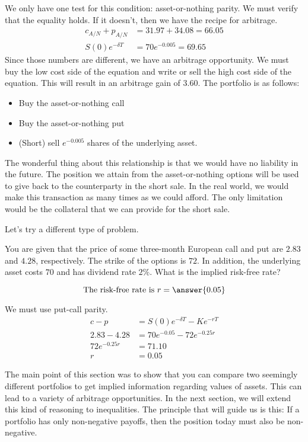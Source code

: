 \documentclass{ximera}
\begin{document}
\begin{solution}
We only have one test for this condition: asset-or-nothing parity. We must verify that the equality holds. If it doesn't, then we have the recipe for arbitrage.
	\begin{align*}
	c_{A/N}+p_{A/N}&=31.97+34.08=66.05\\
	S(0)e^{-\delta T}&=70e^{-0.005}=69.65
	\end{align*}
Since those numbers are different, we have an arbitrage opportunity. We must buy the low cost side of the equation and write or sell the high cost side of the equation. This will result in an arbitrage gain of $3.60$. The portfolio is as follows:
	\begin{itemize}
	\item Buy the asset-or-nothing call\\
	\item Buy the asset-or-nothing put\\
	\item (Short) sell $e^{-0.005}$ shares of the underlying asset.
	\end{itemize}
The wonderful thing about this relationship is that we would have no liability in the future. The position we attain from the asset-or-nothing options will be used to give back to the counterparty in the short sale. In the real world, we would make this transaction as many times as we could afford. The only limitation would be the collateral that we can provide for the short sale.
\end{solution}

Let's try a different type of problem.

\begin{question}
You are given that the price of some three-month European call and put are $2.83$ and $4.28$, respectively. The strike of the options is $72$. In addition, the underlying asset costs $70$ and has dividend rate $2\%$. What is the implied risk-free rate?

	\begin{prompt}
	\[	
	\text{The risk-free rate is }r=\answer{0.05}
	\]
	\end{prompt}
\end{question}

\begin{solution}
We must use put-call parity.
	\begin{align*}
	c-p&=S(0)e^{-\delta T}-Ke^{-rT}\\
	2.83-4.28&=70e^{-0.05}-72e^{-0.25r}\\
	72e^{-0.25r}&=71.10\\
	r&=0.05
	\end{align*}
\end{solution}

The main point of this section was to show that you can compare two seemingly different portfolios to get implied information regarding values of assets. This can lead to a variety of arbitrage opportunities. In the next section, we will extend this kind of reasoning to inequalities. The principle that will guide us is this: If a portfolio has only non-negative payoffs, then the position today must also be non-negative. 
\end{document}
